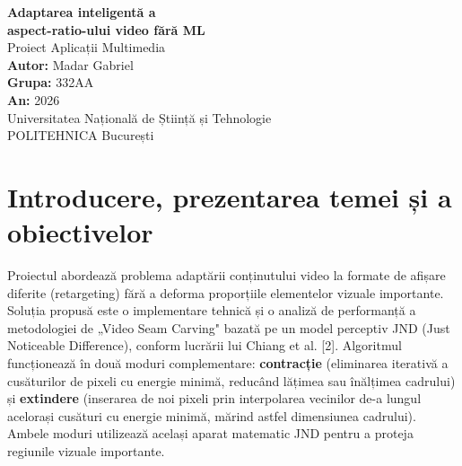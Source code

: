 \documentclass[12pt,a4paper]{article}
\begin{document}
\begin{titlepage}
    \centering
    \vspace*{4cm}
    {\Huge \textbf{Adaptarea inteligentă a\\aspect-ratio-ului video fără ML}}\\[1.5cm]
    {\Large Proiect Aplicații Multimedia}\\[2.5cm]
    {\Large \textbf{Autor:} Madar Gabriel}\\[0.4cm]
    {\Large \textbf{Grupa:} 332AA}\\[0.4cm]
    {\Large \textbf{An:} 2026}\\[3cm]
    \vfill
    {\large Universitatea Națională de Știință și Tehnologie\\POLITEHNICA București}
\end{titlepage}
\tableofcontents
\newpage
\section{Introducere, prezentarea temei și a obiectivelor}
Proiectul abordează problema adaptării conținutului video la formate de afișare diferite (retargeting) fără a deforma proporțiile elementelor vizuale importante. Soluția propusă este o implementare tehnică și o analiză de performanță a metodologiei de „Video Seam Carving" bazată pe un model perceptiv JND (Just Noticeable Difference), conform lucrării lui Chiang et al. [2].
Algoritmul funcționează în două moduri complementare: \textbf{contracție} (eliminarea iterativă a cusăturilor de pixeli cu energie minimă, reducând lățimea sau înălțimea cadrului) și \textbf{extindere} (inserarea de noi pixeli prin interpolarea vecinilor de-a lungul acelorași cusături cu energie minimă, mărind astfel dimensiunea cadrului). Ambele moduri utilizează același aparat matematic JND pentru a proteja regiunile vizuale importante.
\end{document}
